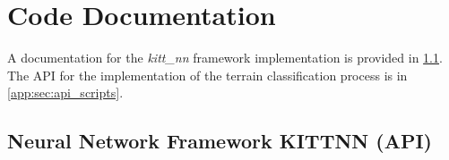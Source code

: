 \chapter{Code Documentation} \label{app:code_documentation}
A documentation for the \textit{kitt\_nn} framework implementation is provided in \cref{app:sec:api_kitt_nn}. The API for the implementation of the terrain classification process is in \cref{app:sec:api_scripts}.

\section{Neural Network Framework KITTNN (API)} \label{app:sec:api_kitt_nn}

\noindent{}
\\
